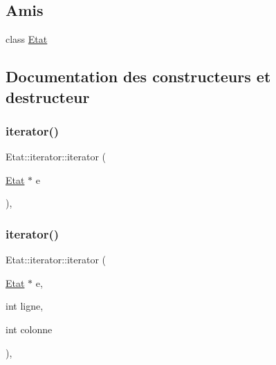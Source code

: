 \subsection*{Amis}
\begin{DoxyCompactItemize}
\item 
class \mbox{\hyperlink{class_etat_1_1iterator_af495e82aa15594b628d4192e8ecb688b}{Etat}}
\end{DoxyCompactItemize}


\subsection{Documentation des constructeurs et destructeur}
\mbox{\label{class_etat_1_1iterator_a01a855525508b81c9fb934919bed65fa}} 
\subsubsection{\texorpdfstring{iterator()}{iterator()}\hspace{0.1cm}{\footnotesize\ttfamily [1/2]}}
{\footnotesize\ttfamily Etat\+::iterator\+::iterator (\begin{DoxyParamCaption}\item[{\mbox{\hyperlink{class_etat}{Etat}} $\ast$}]{e }\end{DoxyParamCaption})\hspace{0.3cm}{\ttfamily [inline]}, {\ttfamily [private]}}

\mbox{\label{class_etat_1_1iterator_a06e37005733f77329198c45ee1c70d3e}} 
\subsubsection{\texorpdfstring{iterator()}{iterator()}\hspace{0.1cm}{\footnotesize\ttfamily [2/2]}}
{\footnotesize\ttfamily Etat\+::iterator\+::iterator (\begin{DoxyParamCaption}\item[{\mbox{\hyperlink{class_etat}{Etat}} $\ast$}]{e,  }\item[{int}]{ligne,  }\item[{int}]{colonne }\end{DoxyParamCaption})\hspace{0.3cm}{\ttfamily [inline]}, {\ttfamily [private]}}

